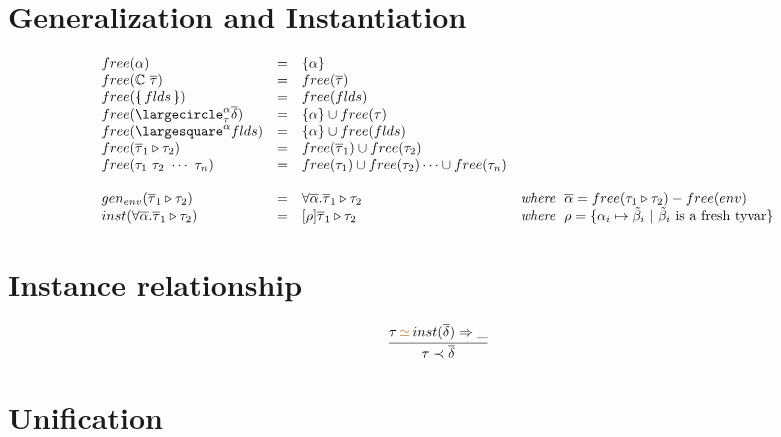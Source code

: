 \documentclass[11pt,a4paper]{article}
\newcommand{\record}[1]{\{\!\!\shortmid #1 \shortmid\!\!\}}
\newcommand{\overld}[3]{\largecircle^{#1}_{#2}{#3}}
\newcommand{\irecrd}[2]{\largesquare^{#1}{#2}}
\newcommand{\flexvar}[1]{\tilde#1}
\newcommand{\whereclause}[1]{\textit{where}\hspace{1.5ex}#1}
\newcommand{\unify}[3]{#1\,{\color{brown}{\simeq}}\,#2 \Rightarrow #3}
\newcommand{\braced}[1]{\{#1\}}
\newcommand{\tycon}{\mathbb{C}}
\newcommand{\type}{\tau}
\newcommand{\qualtype}[2]{#1 \triangleright #2}
\newcommand{\scheme}{\delta}
\newcommand{\vect}[1]{\overline{#1}}
\begin{document}
\section {Generalization and Instantiation}
{\renewcommand{\arraystretch}{1.2}\[\begin{array}{lcll}
free(\alpha)                  & = & \braced{\alpha}                 &       \\
free({\tycon\ \ts})           & = & free(\ts)                 		&       \\
free(\record{flds})           & = & free(flds)                      &       \\
free({\overld{\alpha}{\type}{\s}}) & = & \braced{\alpha} \cup free(\type)    & \\
free({\irecrd{\alpha}{flds}}) & = & \braced{\alpha} \cup free(flds) &       \\
free(\qualtype{\vect\type_1}{\type_2})
                              & = & free(\vect\type_1) \cup free(\type_2)&       \\
free(\type_1\ \type_2\ \cdots\ \type_n)
							  & = & free(\type_1) \cup free(\type_2) \cdots \cup free(\type_n) & \\                           
& & \\
gen_{env}(\qualtype{\vect\type_1}{\type_2})
                              & = & \forall \vect{\alpha}. \qualtype{\vect\type_1}{\type_2}
                                                                    & \whereclause{\vect{\alpha} = free(\qualtype{\type_1}{\type_2}) - free(env)} \\
inst(\forall \vect{\alpha}.\qualtype{\vect\type_1}{\type_2})
                              & = &[\rho]\qualtype{\vect\type_1}{\type_2}& \whereclause{\rho = \braced{\alpha_i \mapsto \flexvar{\beta}_i \ |\ \flexvar{\beta}_i\ \textrm{is a fresh tyvar}}} \\
\end{array}\]}

\section{Instance relationship}
\vspace{-25pt}
\begin{flushright}
\framebox{ $\type \prec \scheme$}
\end{flushright}
\[
	\cfrac{ \unify{\type}{inst(\s)}{\_}}{\type \prec \s}
\]

\section{Unification}
\vspace{-25pt}
\begin{flushright}
\framebox{ $\unify{\type_1}{\type_2}{\rho}$}
\end{flushright}
\end{document}
